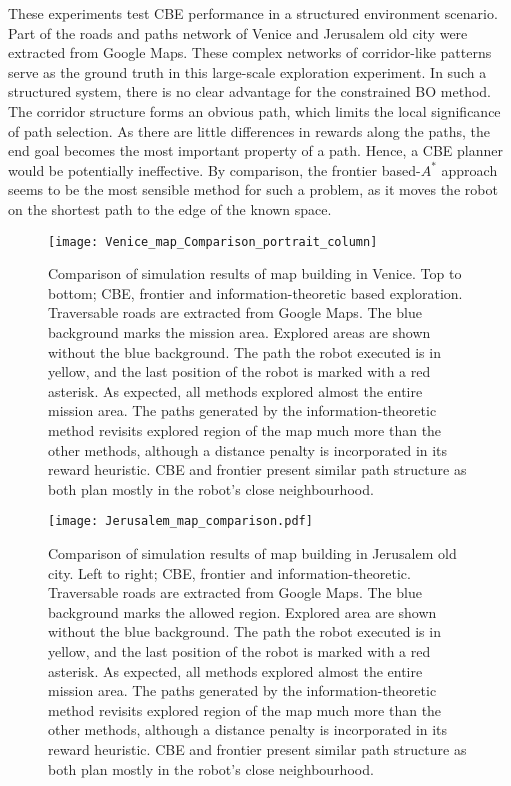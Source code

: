 \documentclass[shortAfour,sageh,times]{sagej_no_sage}
\begin{document}
These experiments test CBE performance in a structured environment scenario. Part of the roads and paths network of Venice and Jerusalem old city were extracted from Google Maps. These complex networks of corridor-like patterns serve as the ground truth in this large-scale exploration experiment. In such a structured system, there is no clear advantage for the constrained BO method. The corridor structure forms an obvious path, which limits the local significance of path selection. As there are little differences in rewards along the paths, the end goal becomes the most important property of a path. Hence, a CBE planner would be potentially ineffective. By comparison, the frontier based-$A^*$ approach seems to be the most sensible method for such a problem, as it moves the robot on the shortest path to the edge of the known space.
  \begin{figure}[]
  	
  	\centering
  	
  	\texttt{[image: Venice\_map\_Comparison\_portrait\_column]}
  	
  	\caption{Comparison of simulation results of map building in Venice. Top to bottom; CBE, frontier and information-theoretic based exploration. Traversable roads are extracted from Google Maps. The blue background marks the mission area. Explored areas are shown without the blue background. The path the robot executed is in yellow, and the last position of the robot is marked with a red asterisk. As expected, all methods explored almost the entire mission area. The paths generated by the information-theoretic method revisits explored region of the map much more than the other methods, although a distance penalty is incorporated in its reward heuristic. CBE and frontier present similar path structure as both plan mostly in the robot's close neighbourhood.}
  	\label{VeniceMapComparison}
  \end{figure}

  \begin{figure*}[bt]
  	
  	\centering
  	
  	\texttt{[image: Jerusalem\_map\_comparison.pdf]}
  	
  	\caption{Comparison of simulation results of map building in Jerusalem old city. Left to right; CBE, frontier and information-theoretic. Traversable roads are extracted from Google Maps. The blue background marks the allowed region. Explored area are shown without the blue background. The path the robot executed is  in yellow, and the last position of the robot is marked with a red asterisk.  As expected, all methods explored almost the entire mission area. The paths generated by the information-theoretic method revisits explored region of the map much more than the other methods, although a distance penalty is incorporated in its reward heuristic. CBE and frontier present similar path structure as both plan mostly in the robot's close neighbourhood.}
  	\label{JeruslaemMapComparison}
  \end{figure*}
    
\end{document}
